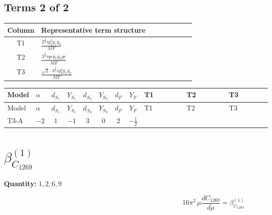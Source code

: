 \documentclass[8pt]{article}
\begin{document}
\begin{landscape}
\subsection*{Terms 2 of 2}
\begin{center}
\begin{tabular}{@{}c >{\raggedright\arraybackslash}p{0.82\linewidth}@{}}
\toprule
Column & Representative term structure \\
\midrule
T1 & \(\displaystyle \frac{3^{\frac{3}{4}} i g_{2}^{2} \overline{y_{1}} \overline{y_{2}}}{MF}\) \\
\midrule
T2 & \(\displaystyle \frac{3^{\frac{3}{4}} i ye \overline{y_{1}} \overline{y_{2}} \overline{ye}}{MF}\) \\
\midrule
T3 & \(\displaystyle \frac{\sqrt{2} \cdot 3^{\frac{3}{4}} i g_{2}^{2} \overline{y_{1}} \overline{y_{2}}}{MF}\) \\
\midrule
\bottomrule
\end{tabular}
\end{center}
\smallskip
\tiny
\begin{longtable}{@{}llcccccc >{\raggedright\arraybackslash}p{0.21\linewidth} >{\raggedright\arraybackslash}p{0.21\linewidth} >{\raggedright\arraybackslash}p{0.21\linewidth}@{}}
\toprule
Model & $\alpha$ & $d_{S_1}$ & $Y_{S_1}$ & $d_{S_2}$ & $Y_{S_2}$ & $d_F$ & $Y_F$ & T1 & T2 & T3 \\
\midrule
\endfirsthead
\toprule
Model & $\alpha$ & $d_{S_1}$ & $Y_{S_1}$ & $d_{S_2}$ & $Y_{S_2}$ & $d_F$ & $Y_F$ & T1 & T2 & T3 \\
\midrule
\endhead
T3-A & $-2$ & $1$ & $-1$ & $3$ & $0$ & $2$ & $-\frac{1}{2}$ & \scriptsize\adjustbox{max width=\linewidth}{$\begin{gathered} \frac{25 \cdot 3^{\frac{3}{4}} i g_{2}^{2} \overline{y_{1}} \overline{y_{2}}}{24 MF}\end{gathered}$} & \scriptsize\adjustbox{max width=\linewidth}{$\begin{gathered} - \frac{3^{\frac{3}{4}} i ye \overline{y_{1}} \overline{y_{2}} \overline{ye}}{12 MF}\end{gathered}$} & \scriptsize\adjustbox{max width=\linewidth}{$\begin{gathered} \frac{\sqrt{2} \cdot 3^{\frac{3}{4}} i g_{2}^{2} \overline{y_{1}} \overline{y_{2}}}{6 MF}\end{gathered}$} \\
\midrule
\bottomrule
\end{longtable}
\clearpage
\section*{$\beta_{C_{1269}}^{(1)}$}
\noindent\textbf{Quantity: }$\mathrm{1,2,6,9}$\par\smallskip
\[16\pi^2\,\mu\frac{d C_{1269}}{d\mu}=\beta_{C_{1269}}^{(1)}\]

\end{landscape}
\end{document}
